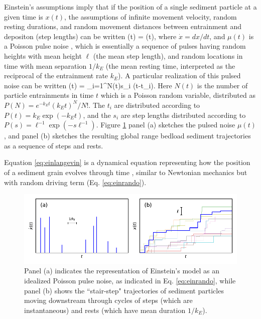 Einstein's assumptions imply that if the position of a single sediment particle at a given time is $x(t)$, the assumptions of infinite movement velocity, random resting durations, and random movement distances between entrainment and depositon (step lengths) can be written
\be {}(t) = \mu(t), \label{eq:einlangevin}\ee
where $\dot{x} = dx/dt$, and $\mu(t)$ is a Poisson pulse noise \citep{VanDenBroeck1983}, which is essentially a sequence of pulses having random heights with mean height $\ell$ (the mean step length), and random locations in time with mean separation $1/k_E$ (the mean resting time, interpreted as the reciprocal of the entrainment rate $k_E$).
A particular realization of this pulsed noise can be written
\be \mu(t) = \sum_{i=1}^{N(t)}s_i \delta(t-t_i). \label{eq:einrando} \ee
Here $N(t)$ is the number of particle entrainments in time $t$ which is  a Poisson random variable, distributed as $P(N) = e^{-k_E t} (k_E t)^N/N!$.
The $t_i$ are distributed according to $P(t) = k_E\exp(-k_E t)$, and the $s_i$ are step lengths distributed according to $P(s) = \ell^{-1}\exp(-s \ell^{-1}).$
Figure \ref{fig:einsteinfig} panel (a) sketches the pulsed noise $\mu(t)$, and panel (b) sketches the resulting global range bedload sediment trajectories as a sequence of steps and rests.

Equation \ref{eq:einlangevin} is a dynamical equation representing how the position of a sediment grain evolves through time \citep{Kubo1978}, similar to Newtonian mechanics \citep{Goldstein1997} but with random driving term (Eq. \ref{eq:einrando}).
\begin{figure}[!htbp]
	\includegraphics[width=\linewidth,keepaspectratio]{./figures/ch1/einsteinConcept.pdf}
	\caption{Panel (a) indicates the representation of Einstein's model as an idealized Poisson pulse noise, as indicated in Eq. \ref{eq:einrando}, while panel (b) shows the ``stair-step" trajectories of sediment particles moving downstream through cycles of steps (which are instantaneous) and rests (which have mean duration $1/k_E$). }
	\label{fig:einsteinfig}
\end{figure}


